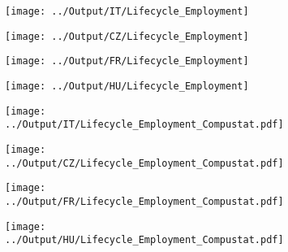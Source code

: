 \documentclass[12pt,notitlepage]{article}
\begin{document}
\begin{figure}[!htpb]
\centering
\caption{Average Employment by Year (Orbis)}
\begin{subfigure}{.49\textwidth}
    \centering
 \texttt{[image: ../Output/IT/Lifecycle\_Employment]}
\end{subfigure}%
\begin{subfigure}{.49\textwidth}
    \centering
 \texttt{[image: ../Output/CZ/Lifecycle\_Employment]}
\end{subfigure}
\begin{subfigure}{.49\textwidth}
    \centering
 \texttt{[image: ../Output/FR/Lifecycle\_Employment]}
\end{subfigure}%
\begin{subfigure}{.49\textwidth}
    \centering
 \texttt{[image: ../Output/HU/Lifecycle\_Employment]}
\end{subfigure}
\end{figure}
\pagebreak

\begin{figure}[!htpb]
\centering
\caption{Average Employment by Year (Compustat)}
\begin{subfigure}{.49\textwidth}
    \centering
 \texttt{[image: ../Output/IT/Lifecycle\_Employment\_Compustat.pdf]}
\end{subfigure}%
\begin{subfigure}{.49\textwidth}
    \centering
 \texttt{[image: ../Output/CZ/Lifecycle\_Employment\_Compustat.pdf]}
\end{subfigure}
\begin{subfigure}{.49\textwidth}
    \centering
 \texttt{[image: ../Output/FR/Lifecycle\_Employment\_Compustat.pdf]}
\end{subfigure}%
\begin{subfigure}{.49\textwidth}
    \centering
 \texttt{[image: ../Output/HU/Lifecycle\_Employment\_Compustat.pdf]}
\end{subfigure}
\end{figure}
\pagebreak
\end{document}
